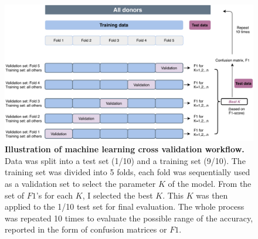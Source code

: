 \begin{figure}[h!]
    \centering
    \includegraphics[scale=0.8]{graphics/ML_demo.pdf}
    \caption{\textbf{Illustration of machine learning cross validation workflow.} Data was split into a test set (1/10) and a training set (9/10). The training set was divided into 5 folds, each fold was sequentially used as a validation set to select the parameter $K$ of the model. From the set of $F1$'s for each $K$, I selected the best $K$. This $K$ was then applied to the 1/10 test set for final evaluation. The whole process was repeated 10 times to evaluate the possible range of the accuracy, reported in the form of confusion matrices or $F1$.}
    \label{fig:cv_demo}
\end{figure}
